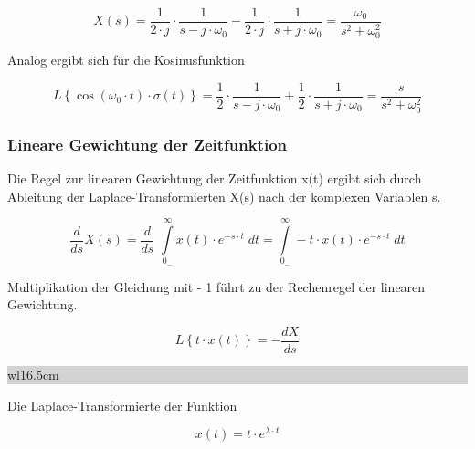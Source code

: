 \begin{equation}\label{eq:fourfourtyfour}
X\left(s\right)=\frac{1}{2\cdot j} \cdot \frac{1}{s-j\cdot \omega _{0} } -\frac{1}{2\cdot j} \cdot \frac{1}{s+j\cdot \omega _{0} } =\frac{\omega _{0} }{s^{2} +\omega _{0}^{2} }
\end{equation}

\noindent Analog ergibt sich für die Kosinusfunktion

\begin{equation}\label{eq:fourfourtyfive}
L\left\{\cos \left(\omega _{0} \cdot t\right)\cdot \sigma \left(t\right)\right\}=\frac{1}{2} \cdot \frac{1}{s-j\cdot \omega _{0} } +\frac{1}{2} \cdot \frac{1}{s+j\cdot \omega _{0} } =\frac{s}{s^{2} +\omega _{0}^{2} } 
\end{equation}

\subsubsection{Lineare Gewichtung der Zeitfunktion}

\noindent Die Regel zur linearen Gewichtung der Zeitfunktion x(t) ergibt sich durch Ableitung der Laplace-Transformierten X(s) nach der komplexen Variablen s.

\begin{equation}\label{eq:fourfourtysix}
\frac{d}{ds} X\left(s\right)=\frac{d}{ds} \, \, \int\limits _{0_{-} }^{\infty }x\left(t\right)\cdot e^{-s\cdot t} \;dt=\int\limits _{0_{-} }^{\infty }-t\cdot x\left(t\right)\cdot e^{-s\cdot t} \; dt
\end{equation}

\noindent Multiplikation der Gleichung mit - 1 führt zu der Rechenregel der linearen Gewichtung.

\begin{equation}\label{eq:fourfourtyseven}
L\left\{t\cdot x\left(t\right)\right\}=-\frac{dX}{ds} 
\end{equation}\bigskip

\noindent
\colorbox{lightgray}{%
%
\renewcommand\arraystretch{0.6}%
\begin{tabular}{ wl{16.5cm} }
{\selectfont{Beispiel: Lineare Gewichtung bei der Laplace-Transformation}}
\end{tabular}%
}\bigskip

\noindent Die Laplace-Transformierte der Funktion

\begin{equation}\label{eq:fourfourtyeight}
x\left(t\right)=t\cdot e^{\lambda \cdot t} 
\end{equation}

